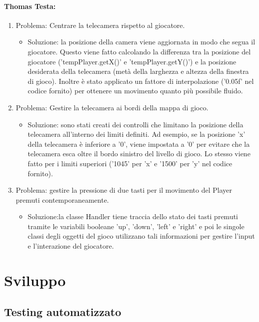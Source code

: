 \documentclass[a4paper,12pt]{report}
\begin{document}
\subsubsection*{Thomas Testa:}
%
\begin{enumerate}
	\item Problema: Centrare la telecamera rispetto al giocatore.
	\begin{itemize}
		\item  Soluzione: la posizione della camera viene aggiornata in modo che segua il giocatore. Questo viene fatto calcolando la differenza tra la posizione del giocatore ('tempPlayer.getX()' e 'tempPlayer.getY()') e la posizione desiderata della telecamera (metà della larghezza e altezza della finestra di gioco). 
		Inoltre è stato applicato un fattore di interpolazione ('0.05f' nel codice fornito) per ottenere un movimento quanto più possibile  fluido.
	\end{itemize}
	\item Problema: Gestire la telecamera ai bordi della mappa di gioco.
	\begin{itemize}
		\item Soluzione: sono stati creati dei controlli che limitano la posizione della telecamera all'interno dei limiti definiti. 
		Ad esempio, se la posizione 'x' della telecamera è inferiore a '0', viene impostata a '0' per evitare che la telecamera esca oltre il bordo sinistro del livello di gioco. Lo stesso viene fatto per i limiti superiori ('1045' per 'x' e '1500' per 'y' nel codice fornito).
	\end{itemize}
	\item Problema: gestire la pressione di due tasti per il movimento del Player premuti contemporaneamente.
	\begin{itemize}
		\item  Soluzione:la classe Handler tiene traccia dello stato dei tasti premuti tramite le variabili booleane 'up', 'down', 'left' e 'right' e poi le singole classi degli oggetti del gioco utilizzano tali informazioni per gestire l'input e l'interazione del giocatore.
	\end{itemize}
\end{enumerate}
%


\chapter{Sviluppo}
\section{Testing automatizzato}
\end{document}
